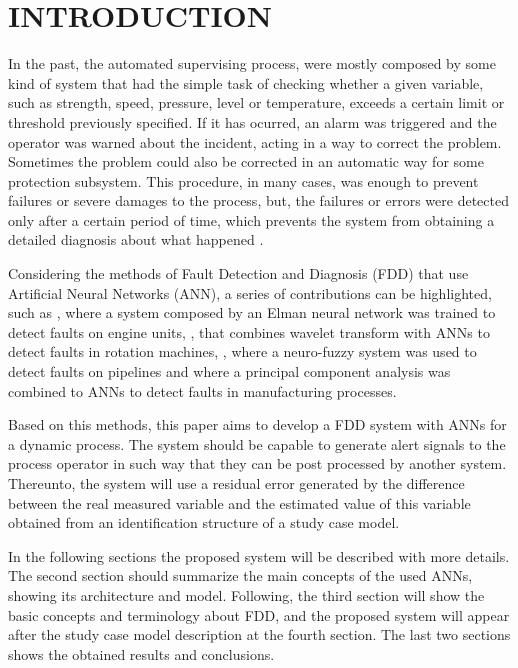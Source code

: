 \documentclass[10pt,fleqn,a4paper]{article}
\begin{document}
\section{INTRODUCTION}
In the past, the automated supervising process, were mostly composed by some
kind of system that had the simple task of checking whether a given variable,
such as strength, speed, pressure, level or temperature, exceeds a certain limit
or threshold previously specified. If it has ocurred, an alarm was triggered
and the operator was warned about the incident, acting in a way to correct the
problem. Sometimes the problem could also be corrected in an automatic way for
some protection subsystem. This procedure, in many cases, was enough to
prevent failures or severe damages to the process, but, the failures or
errors were detected only after a certain period of time, which prevents the
system from obtaining a detailed diagnosis about what happened
\citep{isermann:2006}.

Considering the methods of Fault Detection and Diagnosis (FDD) that use
Artificial Neural Networks (ANN), a series of contributions can be highlighted,
such as \citet{gao:2000}, where a system composed by an Elman neural network was
trained to detect faults on engine units, \citet{guo:2005}, that combines
wavelet transform with ANNs to detect faults in rotation machines,
\citet{tian:2007}, where a neuro-fuzzy system was used to detect faults on
pipelines and \citet{khaled:2010} where a principal component analysis was
combined to ANNs to detect faults in manufacturing processes.

Based on this methods, this paper aims to develop a FDD system with ANNs for a
dynamic process. The system should be capable to generate alert signals to the
process operator in such way that they can be post processed by another system.
Thereunto, the system will use a residual error generated by the difference
between the real measured variable and the estimated value of this variable
obtained from an identification structure of a study case model.

In the following sections the proposed system will be described with more
details. The second section should summarize the main concepts of the used ANNs,
showing its architecture and model. Following, the third section will show the
basic concepts and terminology about FDD, and the proposed system will appear
after the study case model description at the fourth section. The last two
sections shows the obtained results and conclusions.
\end{document}
